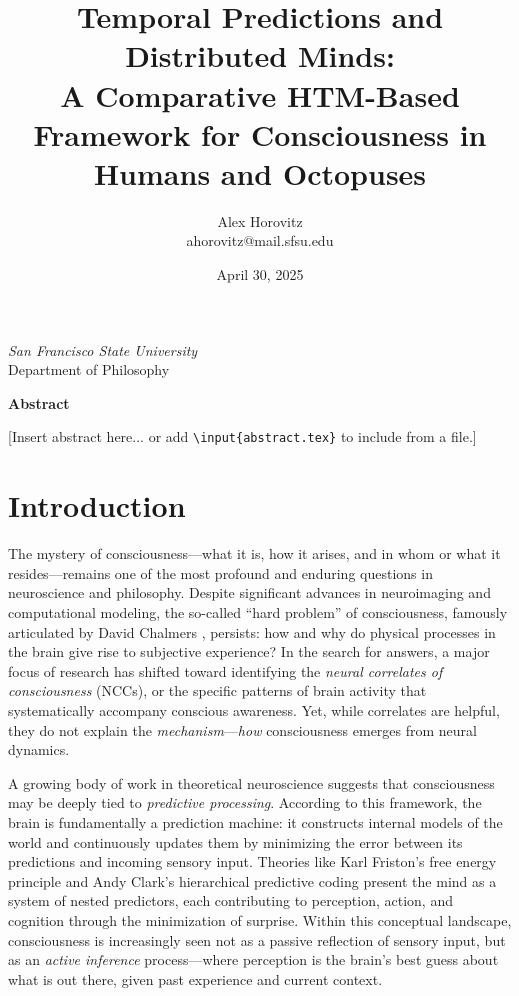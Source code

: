 \documentclass[12pt]{article}
\title{\textbf{Temporal Predictions and Distributed Minds:}\\
A Comparative HTM-Based Framework for Consciousness in Humans and Octopuses}
\author{Alex Horovitz \\ \small ahorovitz@mail.sfsu.edu}
\date{April 30, 2025}
\begin{document}
\maketitle
\thispagestyle{empty} %

\vspace{2em}
\begin{center}
    \textit{San Francisco State University} \\
    Department of Philosophy
\end{center}

\vfill

\begin{center}
    \textbf{Abstract} \\
    \begin{minipage}{0.9\textwidth}
        \small
        [Insert abstract here... or add \texttt{\textbackslash input\{abstract.tex\}} to include from a file.]
    \end{minipage}
\end{center}

\newpage


\section{Introduction}
The mystery of consciousness—what it is, how it arises, and in whom or what it resides—remains one of the most profound and enduring questions in neuroscience and philosophy. Despite significant advances in neuroimaging and computational modeling, the so-called ``hard problem'' of consciousness, famously articulated by David Chalmers \cite{chalmers1996consciousmind}, persists: how and why do physical processes in the brain give rise to subjective experience? In the search for answers, a major focus of research has shifted toward identifying the \textit{neural correlates of consciousness} (NCCs), or the specific patterns of brain activity that systematically accompany conscious awareness. Yet, while correlates are helpful, they do not explain the \textit{mechanism}—\textit{how} consciousness emerges from neural dynamics.

A growing body of work in theoretical neuroscience suggests that consciousness may be deeply tied to \textit{predictive processing}. According to this framework, the brain is fundamentally a prediction machine: it constructs internal models of the world and continuously updates them by minimizing the error between its predictions and incoming sensory input. Theories like Karl Friston's free energy principle \cite{friston2010freeenergy} and Andy Clark's hierarchical predictive coding \cite{clark2016surfinguncertainty} present the mind as a system of nested predictors, each contributing to perception, action, and cognition through the minimization of surprise. Within this conceptual landscape, consciousness is increasingly seen not as a passive reflection of sensory input, but as an \textit{active inference} process—where perception is the brain’s best guess about what is out there, given past experience and current context.
\end{document}
